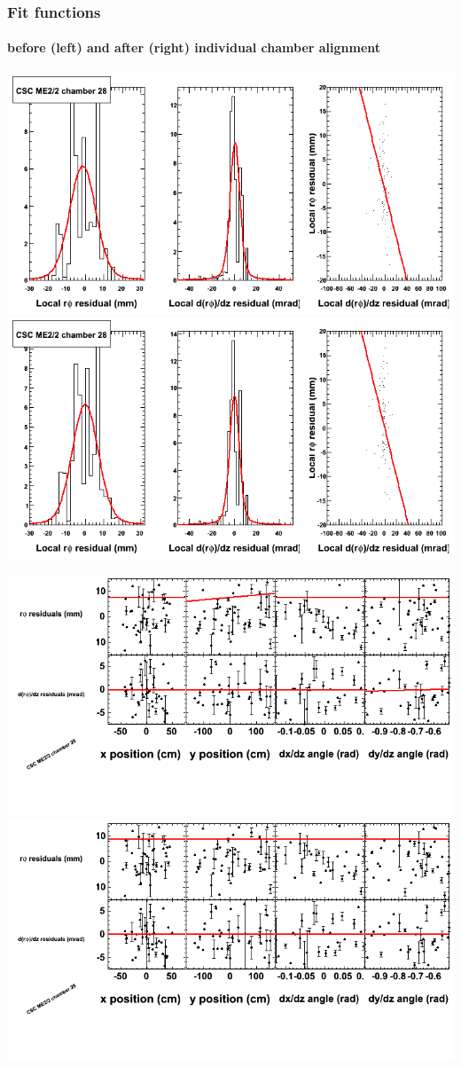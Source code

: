 \documentclass[compress]{beamer}
\begin{document}
\begin{frame}
\frametitle{Fit functions}
\framesubtitle{before (left) and after (right) individual chamber alignment}
\includegraphics[width=0.5\linewidth]{ringfits_3dof/beforefit_MEp22_28_bellcurve.png} \includegraphics[width=0.5\linewidth]{ringfits_3dof/afterfit_MEp22_28_bellcurve.png}

\includegraphics[width=0.5\linewidth]{ringfits_3dof/beforefit_MEp22_28_polynomials.png} \includegraphics[width=0.5\linewidth]{ringfits_3dof/afterfit_MEp22_28_polynomials.png}
\end{frame}
\end{document}
